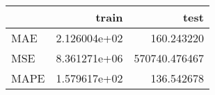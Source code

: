 \begin{tabular}{lrr}
\toprule
{} &         train &           test \\
\midrule
MAE  &  2.126004e+02 &     160.243220 \\
MSE  &  8.361271e+06 &  570740.476467 \\
MAPE &  1.579617e+02 &     136.542678 \\
\bottomrule
\end{tabular}
